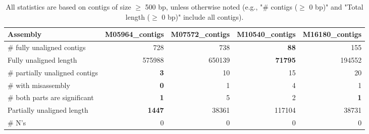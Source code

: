 \documentclass[12pt,a4paper]{article}
\begin{document}
\begin{table}[ht]
\begin{center}
\caption{All statistics are based on contigs of size $\geq$ 500 bp, unless otherwise noted (e.g., "\# contigs ($\geq$ 0 bp)" and "Total length ($\geq$ 0 bp)" include all contigs).}
\begin{tabular}{|l*{4}{|r}|}
\hline
Assembly & M05964\_contigs & M07572\_contigs & M10540\_contigs & M16180\_contigs \\ \hline
\# fully unaligned contigs & 728 & 738 & {\bf 88} & 155 \\ \hline
Fully unaligned length & 575988 & 650139 & {\bf 71795} & 194552 \\ \hline
\# partially unaligned contigs & {\bf 3} & 10 & 15 & 20 \\ \hline
\hspace{5mm}\# with misassembly & {\bf 0} & 1 & 4 & 1 \\ \hline
\hspace{5mm}\# both parts are significant & {\bf 1} & 5 & 2 & {\bf 1} \\ \hline
Partially unaligned length & {\bf 1447} & 38361 & 117104 & 38731 \\ \hline
\# N's & 0 & 0 & 0 & 0 \\ \hline
\end{tabular}
\end{center}
\end{table}
\end{document}
